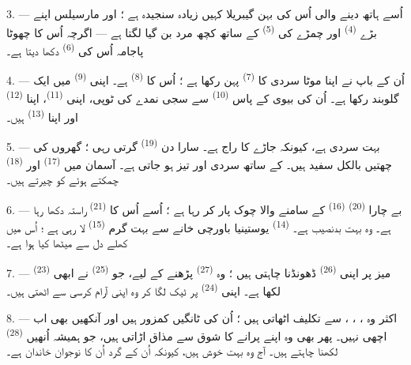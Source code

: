 3. --- اُسے ہاتھ دینے والی اُس کی بہن گیبریلا کہیں زیادہ سنجیدہ ہے ؛
اور مارسیلس اپنے بڑے  \textsuperscript{(4)} اور چمڑے کی
 \textsuperscript{(5)} کے ساتھ کچھ مرد بن گیا لگتا ہے —
اگرچہ اُس کا چھوٹا پاجامہ اُس کی 
\textsuperscript{(6)} دکھا دیتا ہے۔

4. --- اُن کے باپ نے اپنا موٹا سردی کا 
\textsuperscript{(7)} پہن رکھا ہے ؛ اُس کا 
\textsuperscript{(8)} ہے۔ اپنی  \textsuperscript{(9)} میں
ایک گلوبند رکھا ہے۔ اُن کی بیوی کے پاس 
\textsuperscript{(10)} سے سجی نمدے کی ٹوپی، اپنی  \textsuperscript{(11)}، اپنا 
\textsuperscript{(12)} اور اپنا 
\textsuperscript{(13)} ہیں۔

5. --- بہت سردی ہے، کیونکہ جاڑے کا راج ہے۔ سارا دن 
\textsuperscript{(19)} گرتی رہی ؛ گھروں کی چھتیں بالکل سفید ہیں۔
 کے ساتھ سردی اور تیز ہو جاتی ہے۔ آسمان میں
 \textsuperscript{(17)} اور 
\textsuperscript{(18)} چمکتے ہوئے  کو چیرتے ہیں۔

\VUsaut{4.2mm}
\VUsaut{3.0mm}

6. --- بے چارا  \textsuperscript{(20)}
 \textsuperscript{(16)} کے سامنے والا چوک پار کر رہا
ہے ؛ اُسے اُس کا  \textsuperscript{(21)} راستہ دکھا
رہا ہے۔ وہ بہت بدنصیب ہے۔  \textsuperscript{(14)}
یوستینیا باورچی خانے سے بہت گرم  \textsuperscript{(15)}
لا رہی ہے ؛ اُس میں کھلے دل سے میٹھا کیا ہوا  ہے۔

7. ---  \textsuperscript{(23)} میز پر اپنی  \textsuperscript{(26)} ڈھونڈنا چاہتی ہیں ؛ وہ 
\textsuperscript{(27)} پڑھنے کے لیے، جو 
\textsuperscript{(25)} نے ابھی لکھا ہے۔ اپنی 
\textsuperscript{(24)} پر ٹیک لگا کر وہ اپنی آرام کرسی سے اٹھتی ہیں۔

8. --- اکثر وہ ، ،
،  سے تکلیف اٹھاتی ہیں ؛ اُن کی
ٹانگیں کمزور ہیں اور آنکھیں بھی اب اچھی نہیں۔ پھر بھی وہ اپنے پرانے
 کا شوق سے مذاق اڑاتی ہیں، جو ہمیشہ اُنھیں
 \textsuperscript{(28)} لکھنا چاہتے ہیں۔ آج وہ بہت
خوش ہیں، کیونکہ اُن کے گرد اُن کا نوجوان خاندان ہے۔

